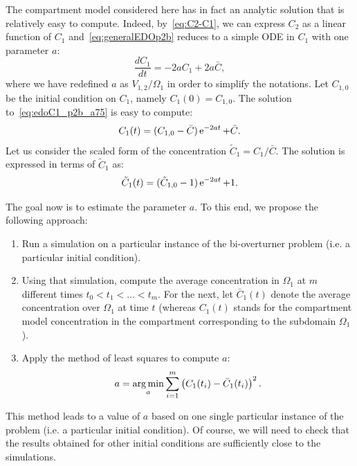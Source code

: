 The compartment model considered here has in fact an analytic solution that is relatively easy to compute. Indeed, by~\eqref{eq:C2-C1}, we can express $C_2$ as a linear function of $C_1$ and~\eqref{eq:generalEDOp2b} reduces to a simple ODE in $C_1$ with one parameter $a$:
\begin{equation} \label{eq:edoC1_p2b_a75}
	\frac{dC_1}{dt} = -2aC_1 + 2a\bar C,
\end{equation}
where we have redefined $a$ as $V_{1,2}/\Omega_1$ in order to simplify the notations. Let $C_{1,0}$ be the initial condition on $C_1$, namely $C_1(0) = C_{1,0}$. The solution to~\eqref{eq:edoC1_p2b_a75} is easy to compute:
\begin{equation}
	C_1(t) = (C_{1,0} - \bar C) \operatorname{e}^{-2at} + \bar C.
\end{equation}
Let us consider the scaled form of the concentration $\tilde C_1 = C_1/\bar C$. The solution is expressed in terms of $\tilde C_1$ as:
\begin{equation}
	\tilde C_1(t) = (\tilde C_{1,0} - 1) \operatorname{e}^{-2at} + 1.
\end{equation}

The goal now is to estimate the parameter $a$. To this end, we propose the following approach:
\begin{enumerate}
	\item Run a simulation on a particular instance of the bi-overturner problem (i.e. a particular initial condition).
	\item Using that simulation, compute the average concentration in $\Omega_1$ at $m$ different times $t_0 < t_1 < \dots < t_m$. For the next, let $\bar C_1(t)$ denote the average concentration over $\Omega_1$ at time $t$ (whereas $C_1(t)$ stands for the compartment model concentration in the compartment corresponding to the subdomain $\Omega_1$).
	\item Apply the method of least squares to compute $a$:
	\begin{equation} \label{eq:a_minimization}
		a = \operatorname*{arg\,min}_a \sum_{i=1}^m \left(C_1(t_i)-\bar C_1(t_i)\right)^2.
	\end{equation}
\end{enumerate}
This method leads to a value of $a$ based on one single particular instance of the problem (i.e. a particular initial condition). Of course, we will need to check that the results obtained for other initial conditions are sufficiently close to the simulations.


